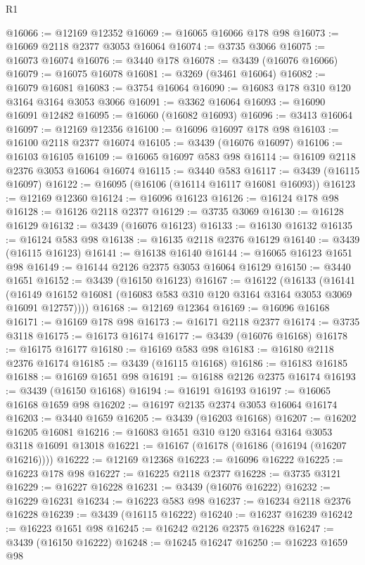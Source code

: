 \begin{lexlean}{R1}
\begin{coremodule}
@16066 := @12169 @12352
@16069 := @16065 @16066 @178 @98
@16073 := @16069 @2118 @2377 @3053 @16064
@16074 := @3735 @3066
@16075 := @16073 @16074
@16076 := @3440 @178
@16078 := @3439 (@16076 @16066)
@16079 := @16075 @16078
@16081 := @3269 (@3461 @16064)
@16082 := @16079 @16081
@16083 := @3754 @16064
@16090 := @16083 @178 @310 @120 @3164 @3164 @3053 @3066
@16091 := @3362 @16064
@16093 := @16090 @16091 @12482
@16095 := @16060 (@16082 @16093)
@16096 := @3413 @16064
@16097 := @12169 @12356
@16100 := @16096 @16097 @178 @98
@16103 := @16100 @2118 @2377 @16074
@16105 := @3439 (@16076 @16097)
@16106 := @16103 @16105
@16109 := @16065 @16097 @583 @98
@16114 := @16109 @2118 @2376 @3053 @16064 @16074
@16115 := @3440 @583
@16117 := @3439 (@16115 @16097)
@16122 := @16095 (@16106 (@16114 @16117 @16081 @16093))
@16123 := @12169 @12360
@16124 := @16096 @16123
@16126 := @16124 @178 @98
@16128 := @16126 @2118 @2377
@16129 := @3735 @3069
@16130 := @16128 @16129
@16132 := @3439 (@16076 @16123)
@16133 := @16130 @16132
@16135 := @16124 @583 @98
@16138 := @16135 @2118 @2376 @16129
@16140 := @3439 (@16115 @16123)
@16141 := @16138 @16140
@16144 := @16065 @16123 @1651 @98
@16149 := @16144 @2126 @2375 @3053 @16064 @16129
@16150 := @3440 @1651
@16152 := @3439 (@16150 @16123)
@16167 := @16122
    (@16133
      (@16141 (@16149 @16152 @16081 (@16083 @583 @310 @120 @3164 @3164 @3053 @3069 @16091 @12757))))
@16168 := @12169 @12364
@16169 := @16096 @16168
@16171 := @16169 @178 @98
@16173 := @16171 @2118 @2377
@16174 := @3735 @3118
@16175 := @16173 @16174
@16177 := @3439 (@16076 @16168)
@16178 := @16175 @16177
@16180 := @16169 @583 @98
@16183 := @16180 @2118 @2376 @16174
@16185 := @3439 (@16115 @16168)
@16186 := @16183 @16185
@16188 := @16169 @1651 @98
@16191 := @16188 @2126 @2375 @16174
@16193 := @3439 (@16150 @16168)
@16194 := @16191 @16193
@16197 := @16065 @16168 @1659 @98
@16202 := @16197 @2135 @2374 @3053 @16064 @16174
@16203 := @3440 @1659
@16205 := @3439 (@16203 @16168)
@16207 := @16202 @16205 @16081
@16216 := @16083 @1651 @310 @120 @3164 @3164 @3053 @3118 @16091 @13018
@16221 := @16167 (@16178 (@16186 (@16194 (@16207 @16216))))
@16222 := @12169 @12368
@16223 := @16096 @16222
@16225 := @16223 @178 @98
@16227 := @16225 @2118 @2377
@16228 := @3735 @3121
@16229 := @16227 @16228
@16231 := @3439 (@16076 @16222)
@16232 := @16229 @16231
@16234 := @16223 @583 @98
@16237 := @16234 @2118 @2376 @16228
@16239 := @3439 (@16115 @16222)
@16240 := @16237 @16239
@16242 := @16223 @1651 @98
@16245 := @16242 @2126 @2375 @16228
@16247 := @3439 (@16150 @16222)
@16248 := @16245 @16247
@16250 := @16223 @1659 @98

\end{coremodule}
\end{lexlean}
